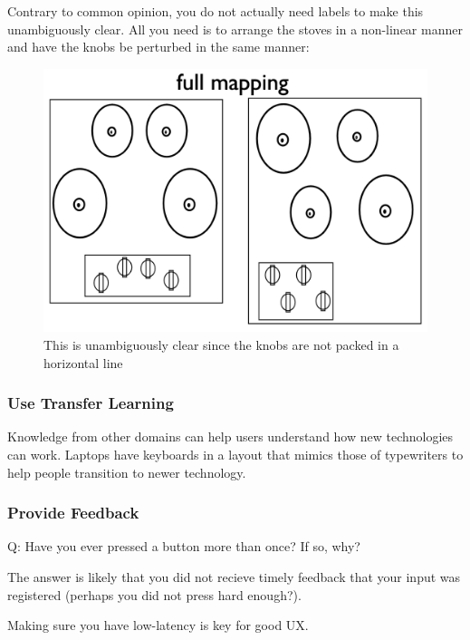 Contrary to common opinion, you do not actually need labels to make this unambiguously clear. All you need is to arrange the stoves in a non-linear manner and have the knobs be perturbed in the same manner:
\begin{figure}[H]
    \centering
    \includegraphics[scale=0.2]{lectures/wk4/img/stove.png}
    \caption{This is unambiguously clear since the knobs are not packed in a horizontal line}
    \label{fig:stove}
\end{figure}

\subsubsection{Use Transfer Learning}
Knowledge from other domains can help users understand how new technologies can work. Laptops have keyboards in a layout that mimics those of typewriters to help people transition to newer technology.

\subsubsection{Provide Feedback}
\begin{shaded}
Q: Have you ever pressed a button more than once? If so, why?
\end{shaded}
The answer is likely that you did not recieve timely feedback that your input was registered (perhaps you did not press hard enough?).

Making sure you have low-latency is key for good UX.

